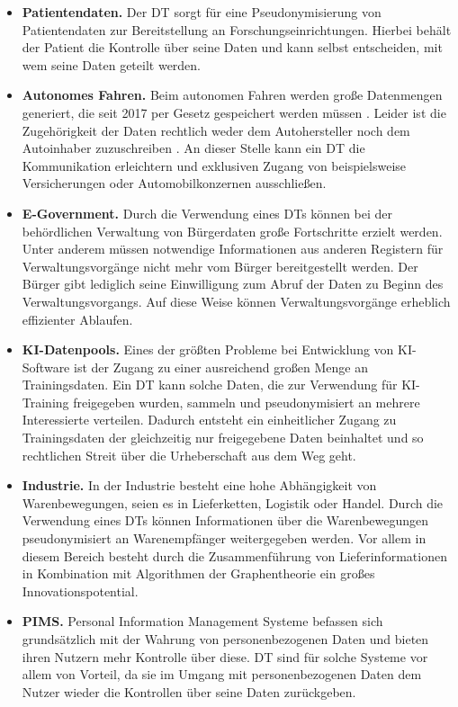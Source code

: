 \documentclass[
	fontsize=11pt,
	headings=small,
	parskip=half,           %
	bibliography=totoc,
	numbers=noenddot,       %
	open=any,               %
]{scrreprt}
\begin{document}
\begin{itemize}
    \item \textbf{Patientendaten.} Der DT sorgt für eine Pseudonymisierung von Patientendaten zur Bereitstellung an Forschungseinrichtungen. Hierbei behält der Patient die Kontrolle über seine Daten und kann selbst entscheiden, mit wem seine Daten geteilt werden.
    \item \textbf{Autonomes Fahren.} Beim autonomen Fahren werden große Datenmengen generiert, die seit 2017 per Gesetz gespeichert werden müssen \cite{dt-bundesdruckereiDatentreuhänder}. Leider ist die Zugehörigkeit der Daten rechtlich weder dem Autohersteller noch dem Autoinhaber zuzuschreiben \cite{dt-richter2020ddvtalk}. An dieser Stelle kann ein DT die Kommunikation erleichtern und exklusiven Zugang von beispielsweise Versicherungen oder Automobilkonzernen ausschließen.
    \item \textbf{E-Government.} Durch die Verwendung eines DTs können bei der behördlichen Verwaltung von Bürgerdaten große Fortschritte erzielt werden. Unter anderem müssen notwendige Informationen aus anderen Registern für Verwaltungsvorgänge nicht mehr vom Bürger bereitgestellt werden. Der Bürger gibt lediglich seine Einwilligung zum Abruf der Daten zu Beginn des Verwaltungsvorgangs. Auf diese Weise können Verwaltungsvorgänge erheblich effizienter Ablaufen.
    \item \textbf{KI-Datenpools.} Eines der größten Probleme bei Entwicklung von KI-Software ist der Zugang zu einer ausreichend großen Menge an Trainingsdaten. Ein DT kann solche Daten, die zur Verwendung für KI-Training freigegeben wurden, sammeln und pseudonymisiert an mehrere Interessierte verteilen. Dadurch entsteht ein einheitlicher Zugang zu Trainingsdaten der gleichzeitig nur freigegebene Daten beinhaltet und so rechtlichen Streit über die Urheberschaft aus dem Weg geht.
    \item \textbf{Industrie.} In der Industrie besteht eine hohe Abhängigkeit von Warenbewegungen, seien es in Lieferketten, Logistik oder Handel. Durch die Verwendung eines DTs können Informationen über die Warenbewegungen pseudonymisiert an Warenempfänger weitergegeben werden. Vor allem in diesem Bereich besteht durch die Zusammenführung von Lieferinformationen in Kombination mit Algorithmen der Graphentheorie ein großes Innovationspotential.
    \item \textbf{PIMS.} Personal Information Management Systeme befassen sich grundsätzlich mit der Wahrung von personenbezogenen Daten und bieten ihren Nutzern mehr Kontrolle über diese.  DT sind für solche Systeme vor allem von Vorteil, da sie im Umgang mit personenbezogenen Daten dem Nutzer wieder die Kontrollen über seine Daten zurückgeben.
\end{itemize}
\end{document}

